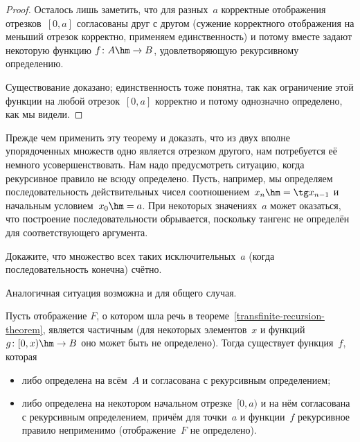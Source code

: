 \begin{proof}
Осталось лишь заметить, что для разных~$a$ корректные
отображения отрезков~$[0,a]$ согласованы друг с другом (сужение
корректного отображения на меньший отрезок корректно,
применяем единственность) и потому вместе задают некоторую
функцию $f\colon A\hm\to B$, удовлетворяющую рекурсивному определению.

Существование доказано; единственность тоже понятна, так
как ограничение этой функции на любой отрезок~$[0,a]$
корректно и потому однозначно определено, как мы видели.
\end{proof}

Прежде чем применить эту теорему и доказать, что из двух
вполне упорядоченных множеств одно является отрезком другого,
нам потребуется её немного усовершенствовать.
Нам надо предусмотреть ситуацию, когда рекурсивное правило
не всюду определено. Пусть, например, мы определяем последовательность
действительных чисел соотношением~$x_{n}\hm=\tg x_{n-1}$ и начальным
условием~$x_0\hm=a$. При некоторых значениях~$a$ может оказаться, что построение
последовательности обрывается, поскольку тангенс не определён
для соответствующего аргумента.

\begin{problem}
Докажите, что множество всех таких  исключительных~$a$
(когда последовательность конечна) счётно.
\end{problem}

\problskip
Аналогичная ситуация возможна и для общего случая.

\begin{theorem}\label{partial-transfinite-recursion}
Пусть отображение $F$, о котором шла речь в
теореме~\ref{transfinite-recursion-theorem}, является частичным
(для некоторых элементов~$x$ и функций $g\colon [0,x)\hm\to B$
оно может быть не определено). Тогда существует функция~$f$,
которая
\begin{itemize}
\item
либо определена на всём~$A$ и согласована с рекурсивным
определением;
\item
либо определена на некотором начальном отрезке~$[0,a)$ и
на нём согласована с рекурсивным определением, причём
для точки~$a$ и функции~$f$ рекурсивное правило неприменимо
(отображение~$F$ не определено).
\end{itemize}
\end{theorem}

